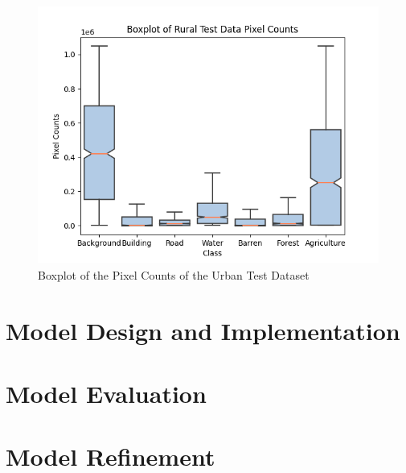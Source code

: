 \begin{figure}[!h]
\includegraphics[width=15.0cm, height=8.5cm]{images/rural test boxplot.png}
\centering
\caption{Boxplot of the Pixel Counts of the Urban Test Dataset}
\label{fig:boxplot-urban-train}
\end{figure}
\FloatBarrier






\section{Model Design and Implementation}

\section{Model Evaluation}

\section{Model Refinement}
